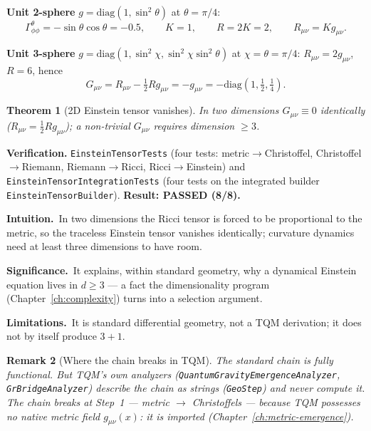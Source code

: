 \documentclass[10pt,twoside,openany]{book}
\newtheorem{theorem}{Theorem}[chapter]
\newtheorem{remark}[theorem]{Remark}
\newcommand{\theoremnotes}[3]{%
  \par\medskip\noindent
  \textbf{Intuition.}\ #1\par
  \textbf{Significance.}\ #2\par
  \textbf{Limitations.}\ #3\par}
\begin{document}
\textbf{Unit 2-sphere} $g=\mathrm{diag}(1,\sin^2\theta)$ at $\theta=\pi/4$:
\begin{equation}
\Gamma^\theta_{\phi\phi} = -\sin\theta\cos\theta = -0.5,
\qquad K = 1, \qquad R = 2K = 2, \qquad R_{\mu\nu}=K g_{\mu\nu}.
\end{equation}

\textbf{Unit 3-sphere} $g=\mathrm{diag}(1,\sin^2\chi,\sin^2\chi\sin^2\theta)$ at
$\chi=\theta=\pi/4$: $R_{\mu\nu}=2g_{\mu\nu}$, $R=6$, hence
\begin{equation}
G_{\mu\nu} = R_{\mu\nu} - \tfrac12 R g_{\mu\nu} = -g_{\mu\nu}
= -\mathrm{diag}(1,\tfrac12,\tfrac14).
\end{equation}

\begin{theorem}[2D Einstein tensor vanishes]
In two dimensions $G_{\mu\nu}\equiv0$ identically ($R_{\mu\nu}=\tfrac12 R g_{\mu\nu}$); a
non-trivial $G_{\mu\nu}$ requires dimension $\ge3$.
\end{theorem}

\textbf{Verification.} \texttt{EinsteinTensorTests} (four tests: metric$\to$Christoffel,
Christoffel$\to$Riemann, Riemann$\to$Ricci, Ricci$\to$Einstein) and
\texttt{EinsteinTensorIntegrationTests} (four tests on the integrated builder
\texttt{EinsteinTensorBuilder}). \textbf{Result: PASSED (8/8).}

\theoremnotes
{In two dimensions the Ricci tensor is forced to be proportional to the metric, so the
traceless Einstein tensor vanishes identically; curvature dynamics need at least three
dimensions to have room.}
{It explains, within standard geometry, why a dynamical Einstein equation lives in
$d\ge3$ --- a fact the dimensionality program (Chapter~\ref{ch:complexity}) turns into a
selection argument.}
{It is standard differential geometry, not a TQM derivation; it does not by itself
produce $3{+}1$.}

\begin{remark}[Where the chain breaks in TQM]
The standard chain is fully functional. But TQM's own analyzers
(\texttt{QuantumGravityEmergenceAnalyzer}, \texttt{GrBridgeAnalyzer}) \emph{describe} the
chain as strings (\texttt{GeoStep}) and \emph{never compute} it. The chain breaks at
Step~1 — \emph{metric} $\to$ \emph{Christoffels} — because TQM possesses no native metric
field $g_{\mu\nu}(x)$: it is imported (Chapter~\ref{ch:metric-emergence}).
\end{remark}

\end{document}
